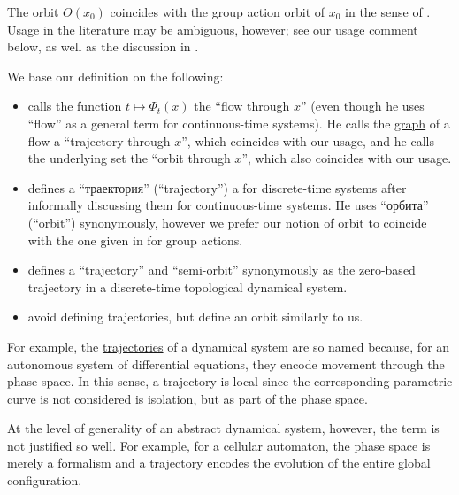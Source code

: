 \begin{comments}
  \item The orbit \( O(x_0) \) coincides with the group action orbit of \( x_0 \) in the sense of . Usage in the literature may be ambiguous, however; see our usage comment below, as well as the discussion in \cite{MathSE:orbit_and_trajectory_in_dynamical_system}.

  \item We base our definition on the following:
  \begin{itemize}
    \item {} calls the function \( t \mapsto \Phi_t(x) \) the \enquote{flow through \( x \)} (even though he uses \enquote{flow} as a general term for continuous-time systems). He calls the \hyperref[def:set_valued_map/graph]{graph} of a flow a \enquote{trajectory through \( x \)}, which coincides with our usage, and he calls the underlying set the \enquote{orbit through \( x \)}, which also coincides with our usage.

    \item {} defines a \enquote{траектория} (\enquote{trajectory}) a for discrete-time systems after informally discussing them for continuous-time systems. He uses \enquote{орбита} (\enquote{orbit}) synonymously, however we prefer our notion of orbit to coincide with the one given in  for group actions.

    \item {} defines a \enquote{trajectory} and \enquote{semi-orbit} synonymously as the zero-based trajectory in a discrete-time topological dynamical system.

    \item {} avoid defining trajectories, but define an orbit similarly to us.
  \end{itemize}
\end{comments}

\begin{remark}\label{rem:dynamical_system_trajectory_terminology}
  For example, the \hyperref[def:dynamical_system_trajectory]{trajectories} of a dynamical system are so named because, for an autonomous system of differential equations, they encode movement through the phase space. In this sense, a trajectory is local since the corresponding parametric curve is not considered is isolation, but as part of the phase space.

  At the level of generality of an abstract dynamical system, however, the term is not justified so well. For example, for a \hyperref[def:cellular_automaton]{cellular automaton}, the phase space is merely a formalism and a trajectory encodes the evolution of the entire global configuration.
\end{remark}

